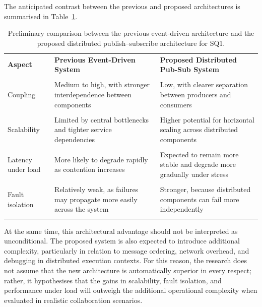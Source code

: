 \documentclass[11pt]{article}
\begin{document}
The anticipated contrast between the previous and proposed architectures is summarised in Table~\ref{tab:sq1-comparison}.

\begin{table}[H]
    \centering
    \renewcommand{\arraystretch}{1.2}
    \begin{tabularx}{0.95\textwidth}{>{\raggedright\arraybackslash}p{}>{\raggedright\arraybackslash}X>{\raggedright\arraybackslash}X}
        \rowcolor{dverseblue!15}
        \toprule
        \textbf{Aspect} & \textbf{Previous Event-Driven System} & \textbf{Proposed Distributed Pub-Sub System} \\\\        \midrule
        Coupling & Medium to high, with stronger interdependence between components & Low, with clearer separation between producers and consumers \\\\        Scalability & Limited by central bottlenecks and tighter service dependencies & Higher potential for horizontal scaling across distributed components \\\\        Latency under load & More likely to degrade rapidly as contention increases & Expected to remain more stable and degrade more gradually under stress \\\\        Fault isolation & Relatively weak, as failures may propagate more easily across the system & Stronger, because distributed components can fail more independently \\\\        \bottomrule
    \end{tabularx}
    \caption{Preliminary comparison between the previous event-driven architecture and the proposed distributed publish--subscribe architecture for SQ1.}
    \label{tab:sq1-comparison}
\end{table}

At the same time, this architectural advantage should not be interpreted as unconditional. The proposed system is also expected to introduce additional complexity, particularly in relation to message ordering, network overhead, and debugging in distributed execution contexts. For this reason, the research does not assume that the new architecture is automatically superior in every respect; rather, it hypothesises that the gains in scalability, fault isolation, and performance under load will outweigh the additional operational complexity when evaluated in realistic collaboration scenarios.
\end{document}

